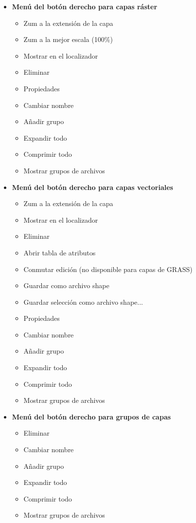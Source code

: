 \begin{itemize}

\item \textbf{Menú del botón derecho para capas ráster}
\begin{itemize}
\item Zum a la extensión de la capa
\item Zum a la mejor escala (100\%)
\item Mostrar en el localizador
\item Eliminar
\item Propiedades
\item Cambiar nombre
\item Añadir grupo
\item Expandir todo
\item Comprimir todo
\item Mostrar grupos de archivos
\end{itemize}

\item \textbf{Menú del botón derecho para capas vectoriales}
\begin{itemize}
\item Zum a la extensión de la capa
\item Mostrar en el localizador
\item Eliminar
\item Abrir tabla de atributos
\item Conmutar edición (no disponible para capas de GRASS)
\item Guardar como archivo shape
\item Guardar selección como archivo shape...
\item Propiedades
\item Cambiar nombre
\item Añadir grupo
\item Expandir todo
\item Comprimir todo
\item Mostrar grupos de archivos
\end{itemize}

\item \textbf{Menú del botón derecho para grupos de capas} 
\begin{itemize}
\item Eliminar
\item Cambiar nombre
\item Añadir grupo
\item Expandir todo
\item Comprimir todo
\item Mostrar grupos de archivos
\end{itemize}

\end{itemize}


